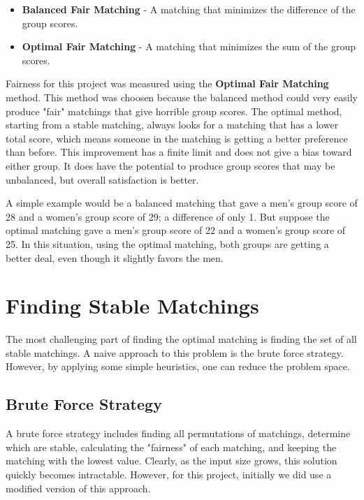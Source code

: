 \documentclass[a4paper]{article}
\begin{document}
\begin{itemize}
    \item \textbf{Balanced Fair Matching} - A matching that minimizes the difference of the group scores.
    \item \textbf{Optimal Fair Matching} - A matching that minimizes the sum of the group scores.
\end{itemize}

Fairness for this project was measured using the \textbf{Optimal Fair Matching} method.
This method was choosen because the balanced method could very easily produce "fair" matchings that give horrible group scores.
The optimal method, starting from a stable matching, always looks for a matching that has a lower total score, which means someone in the matching is getting a better preference than before.
This improvement has a finite limit and does not give a bias toward either group.
It does have the potential to produce group scores that may be unbalanced, but overall satisfaction is better.

A simple example would be a balanced matching that gave a men's group score of 28 and a women's group score of 29; a difference of only 1.
But suppose the optimal matching gave a men's group score of 22 and a women's group score of 25.
In this situation, using the optimal matching, both groups are getting a better deal, even though it slightly favors the men.

\section{Finding Stable Matchings}

The most challenging part of finding the optimal matching is finding the set of all stable matchings. A naive approach to this problem is the brute force strategy. However, by applying some simple heuristics, one can reduce the problem space.

\subsection{Brute Force Strategy}

A brute force strategy includes finding all permutations of matchings, determine which are stable, calculating the "fairness" of each matching, and keeping the matching with the lowest value. Clearly, as the input size grows, this solution quickly becomes intractable. However, for this project, initially we did use a modified version of this approach.
\end{document}
